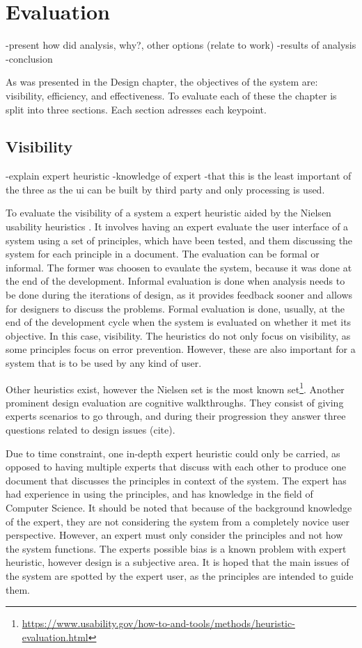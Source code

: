 \chapter{Evaluation}
-present how did analysis, why?, other options (relate to work)
-results of analysis
-conclusion
\par As was presented in the Design chapter, the objectives of the system are: visibility, efficiency, and effectiveness. To evaluate each of these the chapter is split into three sections. Each section adresses each keypoint.
\section{Visibility}
-explain expert heuristic
-knowledge of expert
-that this is the least important of the three as the ui can be built by third party and only processing is used.
\par To evaluate the visibility of a system a expert heuristic aided by the Nielsen usability heuristics \cite{nielsen1995}. It involves having an expert evaluate the user interface of a system using a set of principles, which have been tested, and them discussing the system for each principle in a document. The evaluation can be formal or informal. The former was choosen to evaulate the system, because it was done at the end of the development. Informal evaluation is done when analysis needs to be done during the iterations of design, as it provides feedback sooner and allows for designers to discuss the problems. Formal evaluation is done, usually, at the end of the development cycle when the system is evaluated on whether it met its objective. In this case, visibility. The heuristics do not only focus on visibility, as some principles focus on error prevention. However, these are also important for a system that is to be used by any kind of user.
\par Other heuristics exist, however the Nielsen set is the most known set\footnote{\url{https://www.usability.gov/how-to-and-tools/methods/heuristic-evaluation.html}}. Another prominent design evaluation are cognitive walkthroughs. They consist of giving experts scenarios to go through, and during their progression they  answer three questions related to design issues (cite).
\par Due to time constraint, one in-depth expert heuristic could only be carried, as opposed to having multiple experts that discuss with each other to produce one document that discusses the principles in context of the system. The expert has had experience in using the principles, and has knowledge in the field of Computer Science. It should be noted that because of the background knowledge of the expert, they are not considering the system from a completely novice user perspective. However, an expert must only consider the principles and not how the system functions. The experts possible bias is a known problem with expert heuristic, however design is a subjective area. It is hoped that the main issues of the system are spotted by the expert user, as the principles are intended to guide them.

